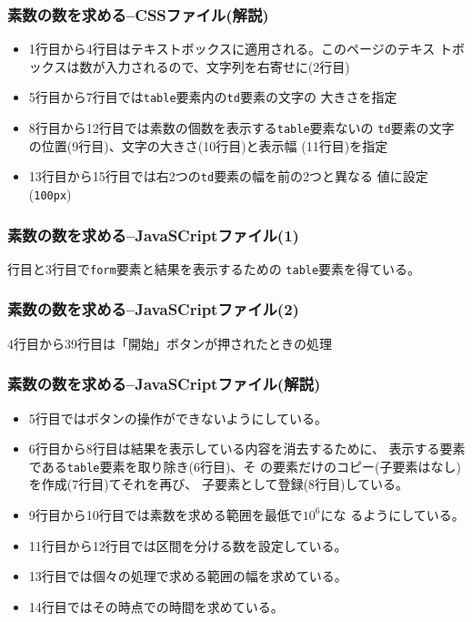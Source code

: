\begin{frame}[containsverbatim]
 \frametitle{素数の数を求める--CSSファイル(解説)}
 \begin{itemize}
  \item 1行目から4行目はテキストボックスに適用される。このページのテキス
        トボックスは数が入力されるので、文字列を右寄せに(2行目)
  \item 5行目から7行目では\texttt{table}要素内の\texttt{td}要素の文字の
        大きさを指定
  \item 8行目から12行目では素数の個数を表示する\texttt{table}要素ないの
        \texttt{td}要素の文字の位置(9行目)、文字の大きさ(10行目)と表示幅
        (11行目)を指定
  \item 13行目から15行目では右2つの\texttt{td}要素の幅を前の2つと異なる
        値に設定(\texttt{100px})
 \end{itemize}
\end{frame}
\begin{frame}[containsverbatim]
 \frametitle{素数の数を求める--JavaSCriptファイル(1)}
行目と3行目で\texttt{form}要素と結果を表示するための
 \texttt{table}要素を得ている。
\end{frame}
\begin{frame}[containsverbatim]
 \frametitle{素数の数を求める--JavaSCriptファイル(2)}
  4行目から39行目は「開始」ボタンが押されたときの処理
\end{frame}
\begin{frame}[containsverbatim]
 \frametitle{素数の数を求める--JavaSCriptファイル(解説)}
 \begin{itemize}
  \item 5行目ではボタンの操作ができないようにしている。
  \item 6行目から8行目は結果を表示している内容を消去するために、
        表示する要素である\texttt{table}要素を取り除き(6行目)、そ
        の要素だけのコピー(子要素はなし)を作成(7行目)てそれを再び、
        子要素として登録(8行目)している。
  \item 9行目から10行目では素数を求める範囲を最低で$10^{6}$にな
        るようにしている。
  \item 11行目から12行目では区間を分ける数を設定している。
  \item 13行目では個々の処理で求める範囲の幅を求めている。
  \item 14行目ではその時点での時間を求めている。
        \end{itemize}
\end{frame}
